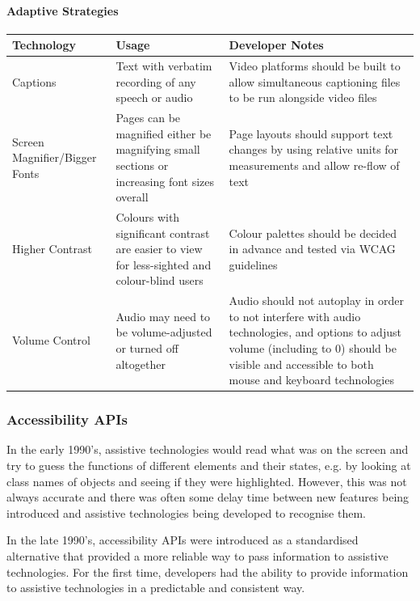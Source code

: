 \documentclass[ %
                    author={Aleena Baig},
                supervisor={Dr Simon Lock},
                    degree={BSc},
                     title={On Making Web Accessible Graphs},
                  subtitle={},
                      year={2019} ]{dissertation}
\begin{document}

\paragraph{Adaptive Strategies}

\begin{center}
\begin{longtable}{|p{3cm}|p{5cm}|p{5cm}|}
 \hline
 Technology & Usage & Developer Notes \\ [0.5ex]
 \hline \hline
 Captions & Text with verbatim recording of any speech or audio & Video platforms should be built to allow simultaneous captioning files to be run alongside video files \\
 \hline
 Screen Magnifier/Bigger Fonts & Pages can be magnified either be magnifying small sections or increasing font sizes overall & Page layouts should support text changes by using relative units for measurements and allow re-flow of text \\
 \hline
 Higher Contrast & Colours with significant contrast are easier to view for less-sighted and colour-blind users & Colour palettes should be decided in advance and tested via WCAG guidelines \\
 \hline
 Volume Control & Audio may need to be volume-adjusted or turned off altogether & Audio should not autoplay in order to not interfere with audio technologies, and options to adjust volume (including to 0) should be visible and accessible to both mouse and keyboard technologies \\ [1ex]
 \hline
\end{longtable}
\end{center}


\subsubsection{Accessibility APIs}

In the early 1990's, assistive technologies would read what was on the screen and try to guess the functions of different elements and their states, e.g. by looking at class names of objects and seeing if they were highlighted. However, this was not always accurate and there was often some delay time between new features being introduced and assistive technologies being developed to recognise them. \cite{smashingAPIs}

In the late 1990's, accessibility APIs were introduced as a standardised alternative that provided a more reliable way to pass information to assistive technologies. For the first time, developers had the ability to provide information to assistive technologies in a predictable and consistent way.
\end{document}
